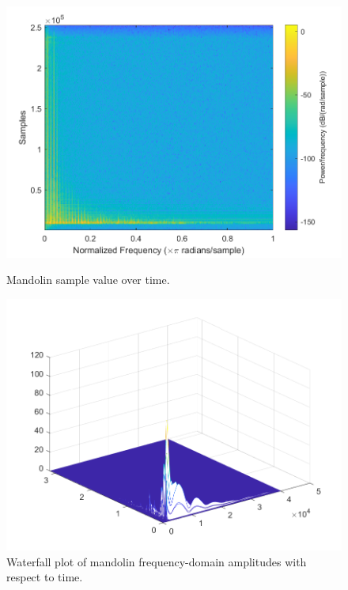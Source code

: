 \documentclass{article}
\begin{document}
            \begin{figure}[H]
                \centering
                \begin{minipage}{.49\textwidth}
                    \includegraphics[width=\linewidth]{images/specMando.png}%
                    \centering
                    \caption{Mandolin sample value over time.}
                    \label{specMando1}
                \end{minipage}
                \begin{minipage}{.49\textwidth}
                    \includegraphics[width=\linewidth]{images/specWaterfallMando1.png}%
                    \centering
                    \caption{Waterfall plot of mandolin frequency-domain amplitudes with respect to time.}
                    \label{specWaterfallMando1}
                \end{minipage}
            \end{figure}
            \newpage
            
\end{document}
